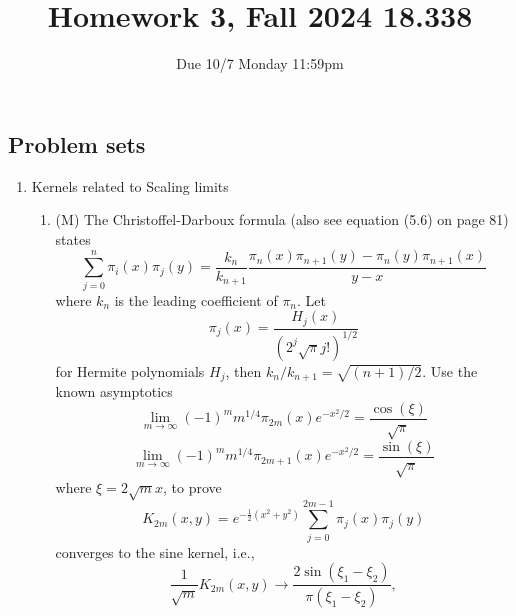 \documentclass{article}
\title{Homework 3, Fall 2024 18.338}
\author{Due 10/7 Monday 11:59pm}
\date{}
\begin{document}
\maketitle




\subsection*{Problem sets}
\begin{enumerate}
    \item Kernels related to Scaling limits
    \begin{enumerate}
        \item (M) The Christoffel-Darboux formula (also see equation (5.6) on page 81) states
        \begin{equation*}
            \sum_{j=0}^n\pi_i(x)\pi_j(y) = \frac{k_n}{k_{n+1}}\frac{\pi_n(x)\pi_{n+1}(y)-\pi_n(y)\pi_{n+1}(x)}{y-x}
        \end{equation*}
        where $k_n$ is the leading coefficient of $\pi_n$. Let 
        \begin{equation*}
            \pi_j(x) = \frac{H_j(x)}{(2^j\sqrt\pi j!)^{1/2}}
        \end{equation*}
        for Hermite polynomials $H_j$, then $k_n/k_{n+1} = \sqrt{ (n+1)/2}$. Use the known asymptotics
        \begin{equation*}
            \lim_{m\to\infty}(-1)^m m^{1/4}\pi_{2m}(x)e^{-x^2/2} = \frac{\cos(\xi)}{\sqrt{\pi}}
        \end{equation*}
        \begin{equation*}
            \lim_{m\to\infty}(-1)^m m^{1/4}\pi_{2m+1}(x)e^{-x^2/2} = \frac{\sin(\xi)}{\sqrt{\pi}}
        \end{equation*}
        where $\xi = 2\sqrt{m}x$, to prove 
        \begin{equation*}
            K_{2m}(x, y) = e^{-\frac{1}{2}(x^2+y^2)}\sum_{j=0}^{2m-1}\pi_j(x)\pi_j(y)
        \end{equation*}
        converges to the sine kernel, i.e., 
        \begin{equation*}
            \frac{1}{\sqrt{m}}K_{2m}(x, y) \to \frac{2\sin(\xi_1-\xi_2)}{\pi(\xi_1-\xi_2)},

\end{equation*}
\end{enumerate}
\end{enumerate}
\end{document}
